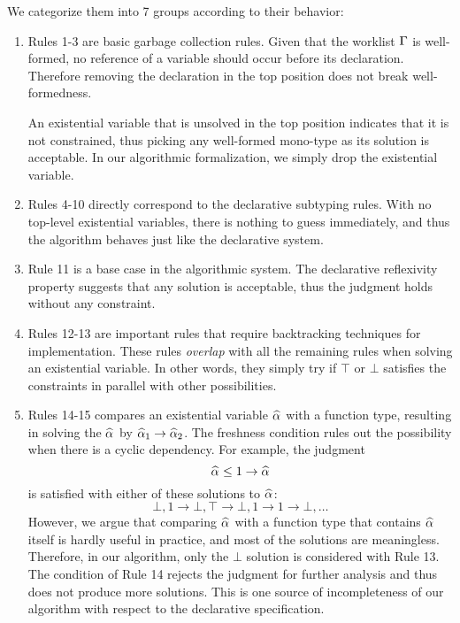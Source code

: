 We categorize them into 7 groups according to their behavior:
\begin{enumerate}
    \item Rules 1-3 are basic garbage collection rules.
        Given that the worklist $\Gamma$ is well-formed,
        no reference of a variable should occur before its declaration.
        Therefore removing the declaration in the top position does not break well-formedness.

        An existential variable that is unsolved in the top position indicates
        that it is not constrained,
        thus picking any well-formed mono-type as its solution is acceptable.
        In our algorithmic formalization, we simply drop the existential variable.

    \item Rules 4-10 directly correspond to the declarative subtyping rules.
        With no top-level existential variables,
        there is nothing to guess immediately,
        and thus the algorithm behaves just like the declarative system.

    \item Rule 11 is a base case in the algorithmic system.
        The declarative reflexivity property suggests that any solution is acceptable,
        thus the judgment holds without any constraint.
    
    \item Rules 12-13 are important rules that require backtracking techniques
        for implementation.
        These rules \emph{overlap} with all the remaining rules when solving
        an existential variable.
        In other words, they simply try if $\top$ or $\bot$ satisfies the constraints
        in parallel with other possibilities.
    
    \item Rules 14-15 compares an existential variable $\al$ with a function type,
        resulting in solving the $\al$ by $\al[1] \to \al[2]$.
        The freshness condition rules out the possibility
        when there is a cyclic dependency.
        For example, the judgment
        \[\al \le 1 \to \al\]
        is satisfied with either of these solutions to $\al$:
        \[ \bot, 1 \to \bot, \top \to \bot, 1 \to 1 \to \bot, \ldots \]
        However, we argue that comparing $\al$ with a function type
        that contains $\al$ itself is hardly useful in practice,
        and most of the solutions are meaningless.
        Therefore, in our algorithm, only the $\bot$ solution is considered
        with Rule 13.
        The condition of Rule 14 rejects the judgment for further analysis
        and thus does not produce more solutions.
        This is one source of incompleteness of our algorithm with respect to the declarative specification.
    

\end{enumerate}
